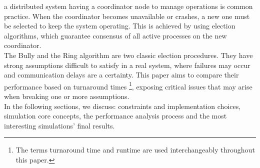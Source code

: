 \documentclass[10pt,journal,compsoc]{IEEEtran}
\begin{document}
 a distributed system having a coordinator node to manage
operations is common practice. When the coordinator becomes unavailable or
crashes, a new one must be selected to keep the system operating. This is
achieved by using election algorithms, which guarantee consensus of all active
processes on the new coordinator. 
\\The Bully \cite{paper:bully} and the Ring algorithm  \cite{paper:ring} are
two classic election procedures. They have strong assumptions difficult to
satisfy in a real system, where failures may occur and communication delays are
a certainty. This paper aims to compare their performance based on turnaround
times \footnote{The terms turnaround time and runtime are used interchangeably
throughout this paper.}, exposing critical issues that may arise when breaking
one or more assumptions. 
\\In the following sections, we discuss: constraints and implementation choices,
simulation core concepts, the performance analysis process and the most
interesting simulations' final results.
\end{document}
